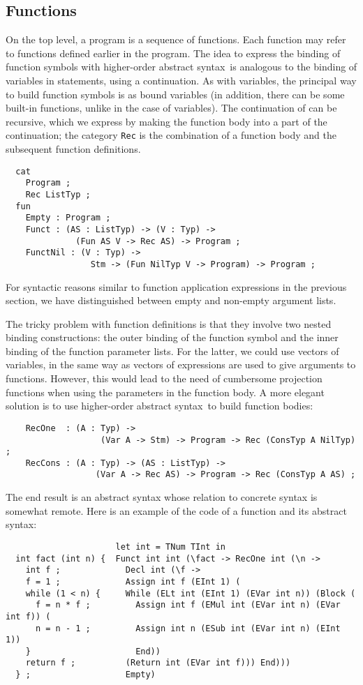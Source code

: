 \documentclass[12pt]{article}
\newcommand{\HOAS}{higher-order abstract syntax}
\begin{document}
\subsection{Functions}

On the top level, a program is a sequence of functions.
Each function may refer to functions defined earlier
in the program. The idea to express the binding of
function symbols with \HOAS\ is analogous to the binding
of variables in statements, using a continuation.
As with variables, the principal way to build function symbols is as
bound variables (in addition, there can be some
built-in functions, unlike in the case of variables).
The continuation of can be recursive, which we express by
making the function body into a part of the continuation;
the category \texttt{Rec} is the combination of a function
body and the subsequent function definitions.
\begin{verbatim}
  cat
    Program ;
    Rec ListTyp ;
  fun
    Empty : Program ;
    Funct : (AS : ListTyp) -> (V : Typ) -> 
              (Fun AS V -> Rec AS) -> Program ;
    FunctNil : (V : Typ) -> 
                 Stm -> (Fun NilTyp V -> Program) -> Program ;
\end{verbatim}
For syntactic reasons similar to function application
expressions in the previous section, we have distinguished between
empty and non-empty argument lists.

The tricky problem with function definitions
is that they involve two nested binding constructions:
the outer binding of the function symbol and the inner
binding of the function parameter lists.
For the latter, we could use
vectors of variables, in the same way as vectors of
expressions are used to give arguments to functions.
However, this would lead to the need of cumbersome
projection functions when using the parameters
in the function body. A more elegant solution is
to use \HOAS\ to build function bodies:
\begin{verbatim}
    RecOne  : (A : Typ) -> 
                   (Var A -> Stm) -> Program -> Rec (ConsTyp A NilTyp) ;
    RecCons : (A : Typ) -> (AS : ListTyp) -> 
                  (Var A -> Rec AS) -> Program -> Rec (ConsTyp A AS) ;
\end{verbatim}
The end result is an abstract syntax whose relation
to concrete syntax is somewhat remote. Here is an example of
the code of a function and its abstract syntax:
\begin{verbatim}
                      let int = TNum TInt in
  int fact (int n) {  Funct int int (\fact -> RecOne int (\n -> 
    int f ;             Decl int (\f -> 
    f = 1 ;             Assign int f (EInt 1) ( 
    while (1 < n) {     While (ELt int (EInt 1) (EVar int n)) (Block (
      f = n * f ;         Assign int f (EMul int (EVar int n) (EVar int f)) (
      n = n - 1 ;         Assign int n (ESub int (EVar int n) (EInt 1)) 
    }                     End)) 
    return f ;          (Return int (EVar int f))) End))) 
  } ;                   Empty)
\end{verbatim}
\end{document}
